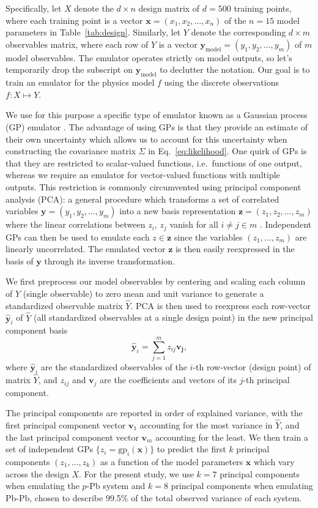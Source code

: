 \documentclass[aps,prc,reprint,amsmath,nofootinbib]{revtex4-1}
\newcommand{\xv}{\mathbf x}
\newcommand{\yv}{\mathbf y}
\newcommand{\zv}{\mathbf z}
\newcommand{\ym}{{\mathbf y}_\text{model}}
\begin{document}
Specifically, let $X$ denote the ${d \times n}$ design matrix of $d=500$ training points, where each training point is a vector $\xv = (x_1, x_2, \dots, x_n)$ of the $n=15$ model parameters in Table~\ref{tab:design}.
Similarly, let $Y$ denote the corresponding ${d \times m}$ observables matrix, where each row of $Y$ is a vector $\ym = (y_1, y_2, \dots, y_m)$ of $m$ model observables.
The emulator operates strictly on model outputs, so let's temporarily drop the subscript on $\ym$ to declutter the notation.
Our goal is to train an emulator for the physics model $f$ using the discrete observations $f: X \mapsto Y$.

We use for this purpose a specific type of emulator known as a Gaussian process (GP) emulator \cite{Rasmussen:2006gp}.
The advantage of using GPs is that they provide an estimate of their own uncertainty which allows us to account for this uncertainty when constructing the covariance matrix $\Sigma$ in Eq.~\eqref{eq:likelihood}.
One quirk of GPs is that they are restricted to scalar-valued functions, i.e.\ functions of one output, whereas we require an emulator for vector-valued functions with multiple outputs.
This restriction is commonly circumvented using principal component analysis (PCA): a general procedure which transforms a set of correlated variables $\yv = (y_1, y_2, \dots, y_m)$ into a new basis representation $\zv = (z_1, z_2, \dots, z_m)$ where the linear correlations between $z_i$, $z_j$ vanish for all $i\ne j \in m$ \cite{Tipping:1999}.
Independent GPs can then be used to emulate each $z \in \zv$ since the variables $(z_1, \dots, z_m)$ are linearly uncorrelated.
The emulated vector $\zv$ is then easily reexpressed in the basis of $\yv$ through its inverse transformation.

We first preprocess our model observables by centering and scaling each column of $Y$ (single observable) to zero mean and unit variance to generate a standardized observable matrix $\hat{Y}$.
PCA is then used to reexpress each row-vector $\hat{\yv}_i$ of $\hat{Y}$ (all standardized observables at a single design point) in the new principal component basis
\begin{equation}
  \hat{\yv}_i = \sum\limits_{j=1}^m z_{ij} \mathbf{v_j},
\end{equation}
where $\hat{\yv}_i$ are the standardized observables of the $i$-th row-vector (design point) of matrix $\hat{Y}$, and $z_{ij}$ and $\mathbf{v}_j$ are the coefficients and vectors of its $j$-th principal component.

The principal components are reported in order of explained variance, with the first principal component vector $\mathbf{v}_1$ accounting for the most variance in $\hat{Y}$, and the last principal component vector $\mathbf{v}_m$ accounting for the least.
We then train a set of independent GPs $\{z_i=\mathrm{gp}_i(\xv)\}$ to predict the first $k$ principal components $(z_1, \dots, z_k)$ as a function of the model parameters $\xv$ which vary across the design $X$.
For the present study, we use $k=7$ principal components when emulating the $p$-Pb system and $k=8$ principal components when emulating Pb-Pb, chosen to describe 99.5\% of the total observed variance of each system.
\end{document}
